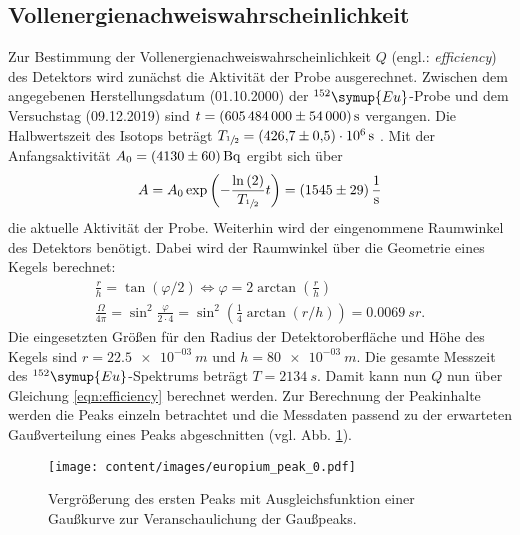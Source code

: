 \subsection{Vollenergienachweiswahrscheinlichkeit}
\label{kap:vw}
Zur Bestimmung der Vollenergienachweiswahrscheinlichkeit $Q$ (engl.: \textit{efficiency}) des Detektors wird zunächst die Aktivität der Probe ausgerechnet.
Zwischen dem angegebenen Herstellungsdatum (01.10.2000) \cite{anleitung} der $^{152}\symup{Eu}$-Probe und dem Versuchstag (09.12.2019) sind $t = \SI{605484000 (54000)}{s}$ vergangen.
Die Halbwertszeit des Isotops beträgt $T_{\sfrac{1}{2}} = \SI{426.7 (5) e+06}{s}$ \cite{nucleide}.
Mit der Anfangsaktivität $A_{0} = \SI{4130 (60)}{Bq}$ ergibt sich über
\begin{equation*}
	A = A_{0} \exp{\left( - \frac{\ln{(2)}}{T_{\sfrac{1}{2}}} t \right)} = \SI{1545(29)}{\per \second}
\end{equation*}
die aktuelle Aktivität der Probe.
Weiterhin wird der eingenommene Raumwinkel des Detektors benötigt.
Dabei wird der Raumwinkel über die Geometrie eines Kegels berechnet:
\begin{align*}
	\frac{r}{h} = \tan{( \varphi / 2 )} \Leftrightarrow \varphi = 2 \arctan{(\frac{r}{h})} \\
	\frac{\Omega}{4 \pi} = \sin^2{\frac{\varphi}{2 \cdot 4}} =  \sin^2{ \left( \frac{1}{4} \arctan{(r/h)} \right)} = \SI{0.0069}{sr}.
	\label{result:raumwinkel}
\end{align*}
Die eingesetzten Größen für den Radius der Detektoroberfläche und Höhe des Kegels sind $r = \SI{22.5e-03}{m}$ und $h = \SI{80e-03}{m}$.
Die gesamte Messzeit des $^{152}\symup{Eu}$-Spektrums beträgt $T=\SI{2134}{s}$.
Damit kann nun $Q$ nun über Gleichung \eqref{eqn:efficiency} berechnet werden.
Zur Berechnung der Peakinhalte werden die Peaks einzeln betrachtet und die Messdaten passend zu der erwarteten Gaußverteilung eines Peaks abgeschnitten (vgl. Abb. \ref{fig:europium_peak_0}).
\begin{figure}[h!]
  \centering
  \texttt{[image: content/images/europium\_peak\_0.pdf]}
  \caption{Vergrößerung des ersten Peaks mit Ausgleichsfunktion einer Gaußkurve zur Veranschaulichung der Gaußpeaks.}
  \label{fig:europium_peak_0}
\end{figure}
